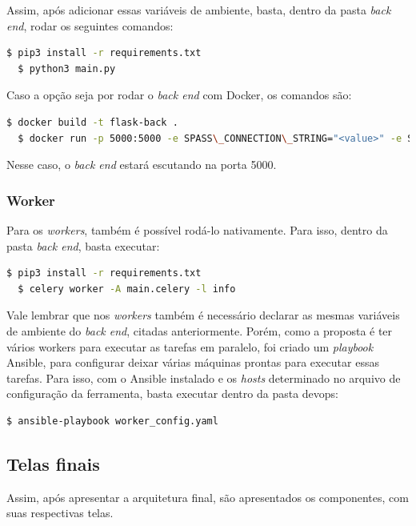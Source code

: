 \documentclass[11pt,twoside]{article}
\begin{document}
Assim, após adicionar essas variáveis de ambiente, basta, dentro da pasta \emph{back end}, rodar os seguintes comandos:

\begin{lstlisting}[language=bash]
  $ pip3 install -r requirements.txt
  $ python3 main.py
\end{lstlisting}

Caso a opção seja por rodar o \emph{back end} com Docker, os comandos são:

\begin{lstlisting}[language=bash]
  $ docker build -t flask-back .
  $ docker run -p 5000:5000 -e SPASS\_CONNECTION\_STRING="<value>" -e SPASS\_DATA\_BLOB\_KEY="<value>" -e SPASS\_CELERY\_BROKER="<value>" flask-back
\end{lstlisting}

Nesse caso, o \emph{back end} estará escutando na porta 5000.

\subsubsection{Worker}

Para os \emph{workers}, também é possível rodá-lo nativamente. Para isso, dentro da pasta \emph{back end}, basta executar:

\begin{lstlisting}[language=bash]
  $ pip3 install -r requirements.txt
  $ celery worker -A main.celery -l info
\end{lstlisting}

Vale lembrar que nos \emph{workers} também é necessário declarar as mesmas variáveis de ambiente do \emph{back end}, citadas anteriormente. 
Porém, como a proposta é ter vários workers para executar as tarefas em paralelo, foi criado um \emph{playbook} Ansible, para configurar deixar várias máquinas prontas para 
executar essas tarefas. Para isso, com o Ansible instalado e os \emph{hosts} determinado no arquivo de configuração da ferramenta, basta executar dentro da pasta devops:

\begin{lstlisting}[language=bash]
  $ ansible-playbook worker_config.yaml
\end{lstlisting}

\subsection{Telas finais}

Assim, após apresentar a arquitetura final, são apresentados os componentes, com suas respectivas telas. 
\end{document}
